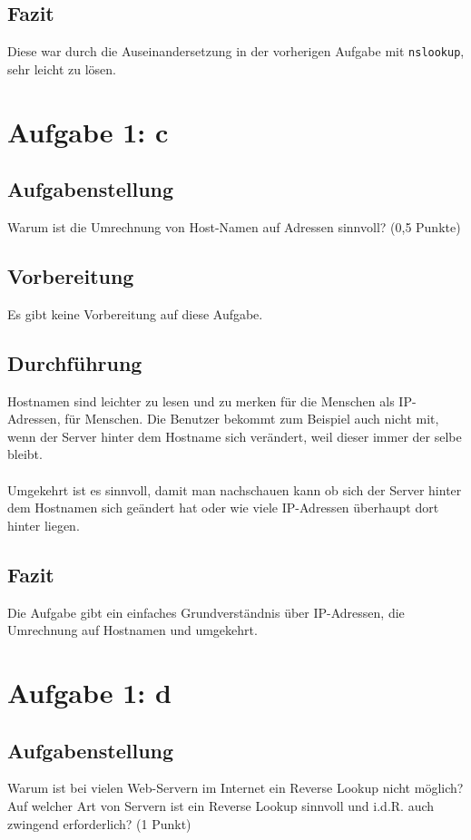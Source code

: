 \subsection{Fazit}
Diese war durch die Auseinandersetzung in der vorherigen Aufgabe mit \texttt{nslookup}, sehr leicht zu lösen.

\newpage
\section{Aufgabe 1: c}

\subsection{Aufgabenstellung}
Warum ist die Umrechnung von Host-Namen auf Adressen sinnvoll? (0,5 Punkte)

\subsection{Vorbereitung}
Es gibt keine Vorbereitung auf diese Aufgabe.

\subsection{Durchführung}
Hostnamen sind leichter zu lesen und zu merken für die Menschen als IP-Adressen, für Menschen. Die Benutzer bekommt zum Beispiel auch nicht mit, wenn der Server hinter dem Hostname sich verändert, weil dieser immer der selbe bleibt. \\\\Umgekehrt ist es sinnvoll, damit man nachschauen kann ob sich der Server hinter dem Hostnamen sich geändert hat oder wie viele IP-Adressen überhaupt dort hinter liegen.  

\subsection{Fazit}
Die Aufgabe gibt ein einfaches Grundverständnis über IP-Adressen, die Umrechnung auf Hostnamen und umgekehrt.

\section{Aufgabe 1: d}

\subsection{Aufgabenstellung}
Warum ist bei vielen Web-Servern im Internet ein Reverse Lookup nicht möglich? Auf welcher Art von Servern ist ein Reverse Lookup sinnvoll und i.d.R. auch zwingend erforderlich? (1 Punkt)


